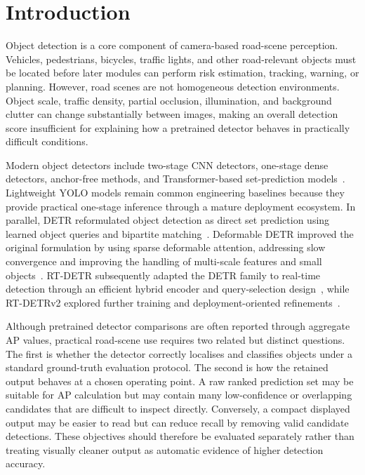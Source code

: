 \documentclass[runningheads]{llncs}
\begin{document}

\section{Introduction}

Object detection is a core component of camera-based road-scene perception. Vehicles, pedestrians, bicycles, traffic lights, and other road-relevant objects must be located before later modules can perform risk estimation, tracking, warning, or planning. However, road scenes are not homogeneous detection environments. Object scale, traffic density, partial occlusion, illumination, and background clutter can change substantially between images, making an overall detection score insufficient for explaining how a pretrained detector behaves in practically difficult conditions.

Modern object detectors include two-stage CNN detectors, one-stage dense detectors, anchor-free methods, and Transformer-based set-prediction models~\cite{zou2023survey,ren2015faster,wang2024yolov10}. Lightweight YOLO models remain common engineering baselines because they provide practical one-stage inference through a mature deployment ecosystem. In parallel, DETR reformulated object detection as direct set prediction using learned object queries and bipartite matching~\cite{carion2020detr}. Deformable DETR improved the original formulation by using sparse deformable attention, addressing slow convergence and improving the handling of multi-scale features and small objects~\cite{zhu2021deformable}. RT-DETR subsequently adapted the DETR family to real-time detection through an efficient hybrid encoder and query-selection design~\cite{zhao2024detrsbeat}, while RT-DETRv2 explored further training and deployment-oriented refinements~\cite{lv2024rtdetrv2}.

Although pretrained detector comparisons are often reported through aggregate AP values, practical road-scene use requires two related but distinct questions. The first is whether the detector correctly localises and classifies objects under a standard ground-truth evaluation protocol. The second is how the retained output behaves at a chosen operating point. A raw ranked prediction set may be suitable for AP calculation but may contain many low-confidence or overlapping candidates that are difficult to inspect directly. Conversely, a compact displayed output may be easier to read but can reduce recall by removing valid candidate detections. These objectives should therefore be evaluated separately rather than treating visually cleaner output as automatic evidence of higher detection accuracy.
\end{document}
